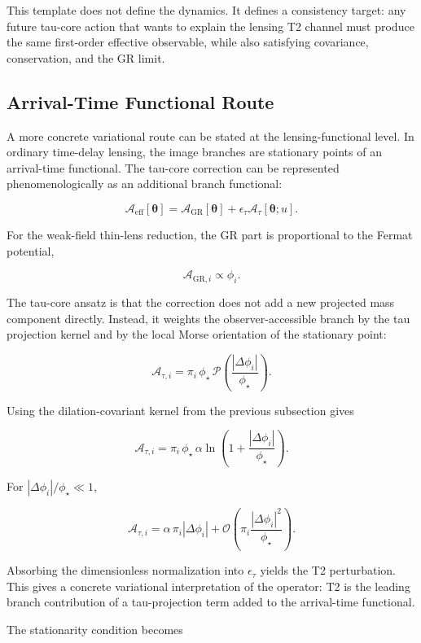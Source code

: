 \documentclass[11pt]{article}
\begin{document}
This template does not define the dynamics. It defines a consistency
target: any future tau-core action that wants to explain the lensing T2
channel must produce the same first-order effective observable, while
also satisfying covariance, conservation, and the GR limit.

\subsection{Arrival-Time Functional
Route}\label{arrival-time-functional-route}

A more concrete variational route can be stated at the
lensing-functional level. In ordinary time-delay lensing, the image
branches are stationary points of an arrival-time functional. The
tau-core correction can be represented phenomenologically as an
additional branch functional:

\[
\mathcal{A}_\mathrm{eff}[\boldsymbol{\theta}]
=
\mathcal{A}_\mathrm{GR}[\boldsymbol{\theta}]
+ \epsilon_\tau \mathcal{A}_\tau[\boldsymbol{\theta};u].
\]

For the weak-field thin-lens reduction, the GR part is proportional to
the Fermat potential,

\[
\mathcal{A}_{\mathrm{GR},i}
\propto
\phi_i.
\]

The tau-core ansatz is that the correction does not add a new projected
mass component directly. Instead, it weights the observer-accessible
branch by the tau projection kernel and by the local Morse orientation
of the stationary point:

\[
\mathcal{A}_{\tau,i}
=
\pi_i\,\phi_\star\,\mathcal{P}
\!\left(
\frac{|\Delta\phi_i|}{\phi_\star}
\right).
\]

Using the dilation-covariant kernel from the previous subsection gives

\[
\mathcal{A}_{\tau,i}
=
\pi_i\,\phi_\star\,
\alpha
\ln\!\left(
1+\frac{|\Delta\phi_i|}{\phi_\star}
\right).
\]

For \(|\Delta\phi_i|/\phi_\star \ll 1\),

\[
\mathcal{A}_{\tau,i}
=
\alpha\,\pi_i|\Delta\phi_i|
+\mathcal{O}\!\left(
\pi_i\frac{|\Delta\phi_i|^2}{\phi_\star}
\right).
\]

Absorbing the dimensionless normalization into \(\epsilon_\tau\) yields
the T2 perturbation. This gives a concrete variational interpretation of
the operator: T2 is the leading branch contribution of a tau-projection
term added to the arrival-time functional.

The stationarity condition becomes
\end{document}
